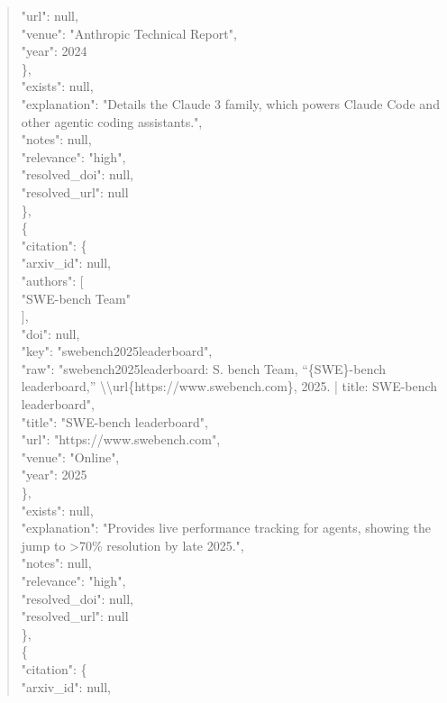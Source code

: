 \documentclass[11pt]{article}
\begin{document}
\begin{quote}
        "url": null,\\
        "venue": "Anthropic Technical Report",\\
        "year": 2024\\
      \},\\
      "exists": null,\\
      "explanation": "Details the Claude 3 family, which powers Claude Code and other agentic coding assistants.",\\
      "notes": null,\\
      "relevance": "high",\\
      "resolved\_doi": null,\\
      "resolved\_url": null\\
    \},\\
    \{\\
      "citation": \{\\
        "arxiv\_id": null,\\
        "authors": [\\
          "SWE-bench Team"\\
        ],\\
        "doi": null,\\
        "key": "swebench2025leaderboard",\\
        "raw": "swebench2025leaderboard: S. bench Team, ``\{SWE\}-bench leaderboard,'' \textbackslash{}\textbackslash{}url\{https://www.swebench.com\}, 2025. | title: SWE-bench leaderboard",\\
        "title": "SWE-bench leaderboard",\\
        "url": "https://www.swebench.com",\\
        "venue": "Online",\\
        "year": 2025\\
      \},\\
      "exists": null,\\
      "explanation": "Provides live performance tracking for agents, showing the jump to >70\% resolution by late 2025.",\\
      "notes": null,\\
      "relevance": "high",\\
      "resolved\_doi": null,\\
      "resolved\_url": null\\
    \},\\
    \{\\
      "citation": \{\\
        "arxiv\_id": null,\\

\end{quote}
\end{document}
